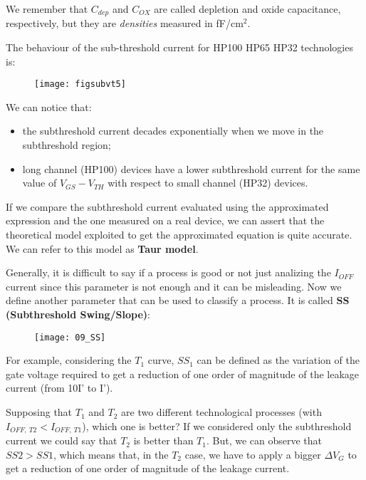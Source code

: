 \documentclass[a4paper, 12pt, twoside, openright]{report}
\begin{document}
We remember that $C_{dep}$ and $C_{OX}$ are called depletion and oxide capacitance, respectively, but they are \emph{densities} measured in fF/cm$^{2}$.

The behaviour of the sub-threshold current for HP100 HP65 HP32 technologies is:

	\begin{figure}[H]
	\centering
	\texttt{[image: figsubvt5]}
	\caption{}
	\label{}
	\end{figure}

We can notice that:

\begin{itemize}
\item the subthreshold current decades exponentially when we move in the subthreshold region;
\item long channel (HP100) devices have a lower subthreshold current for the same value of $V_{GS} - V_{TH}$ with respect to small channel (HP32) devices.
\end{itemize}

If we compare the subthreshold current evaluated using the approximated expression and the one measured on a real device, we can assert that the theoretical model exploited to get the approximated equation is quite accurate. We can refer to this model as \textbf{Taur model}.

Generally, it is difficult to say if a process is good or not just analizing the $I_{OFF}$ current since this parameter is not enough and it can be misleading. Now we define another parameter that can be used to classify a process. It is called \textbf{SS (Subthreshold Swing/Slope)}:

	\begin{figure}[H]
	\centering
	\texttt{[image: 09\_SS]}
	\caption{}
	\label{}
	\end{figure}

For example, considering the $T_{1}$ curve, $SS_{1}$ can be defined as the variation of the gate voltage required to get a reduction of one order of magnitude of the leakage current (from 10I' to I').

Supposing that $T_{1}$ and $T_{2}$ are two different technological processes (with $I_{OFF,\ T2} < I_{OFF,\ T1}$), which one is better? If we considered only the subthreshold current we could say that $T_{2}$ is better than $T_{1}$. But, we can observe that $SS2 > SS1$, which means that, in the $T_{2}$ case, we have to apply a bigger $\Delta V_G$ to get a reduction of one order of magnitude of the leakage current.
\end{document}
